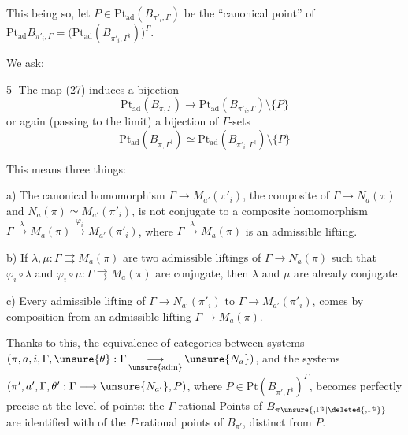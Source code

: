 This being so, let $P\in\mathrm{Pt}_{\mathrm{ad}}(B_{\pi'_i,\Gamma})$
be the ``canonical point'' of
$\mathrm{Pt}_{\mathrm{ad}}B_{\pi'_i,\Gamma}
=\bigl(\mathrm{Pt}_{\mathrm{ad}}(B_{\pi'_i,\Gamma^{\natural}})\bigr)^\Gamma$.


We ask:

\textcircled{5} The map (27) induces a \uline{bijection}
\[
\mathrm{Pt}_{\mathrm{ad}}(B_{\pi,\Gamma})
\longrightarrow
\mathrm{Pt}_{\mathrm{ad}}(B_{\pi'_i,\Gamma})\setminus\{P\}
\]
or again (passing to the limit) a bijection of $\Gamma$-sets
\[
\mathrm{Pt}_{\mathrm{ad}}(B_{\pi,\Gamma^{\natural}})
\simeq
\mathrm{Pt}_{\mathrm{ad}}(B_{\pi'_i,\Gamma^{\natural}})\setminus\{P\}
\]

This means three things:

a) The canonical homomorphism $\Gamma\longrightarrow M_{a'}(\pi'_i)$,
the composite of $\Gamma\longrightarrow N_a(\pi)$ and
$N_a(\pi)\simeq M_{a'}(\pi'_i)$,
is not conjugate to a composite homomorphism
$\Gamma\xrightarrow{\lambda}M_a(\pi)
\xrightarrow{\varphi_i}M_{a'}(\pi'_i)$,
where $\Gamma\xrightarrow{\lambda}M_a(\pi)$ is an admissible lifting.

b) If $\lambda,\mu:\Gamma\rightrightarrows M_a(\pi)$ are two
admissible liftings of $\Gamma\longrightarrow N_a(\pi)$
 such that
$\varphi_i\circ\lambda$ and $\varphi_i\circ\mu:
\Gamma\rightrightarrows M_a(\pi)$ are
conjugate, then $\lambda$ and $\mu$ are already
\inserted{$\pi$-}conjugate.

c) Every admissible lifting of
$\Gamma\longrightarrow N_{a'}(\pi'_i)$ to
$\Gamma\longrightarrow M_{a'}(\pi'_i)$,
comes by composition from an admissible lifting
$\Gamma\longrightarrow M_a(\pi)$.


Thanks to this, the equivalence of categories between systems
$(\pi,a,i,\Gamma,\unsure{\theta}:\Gamma\mathop{\longrightarrow}\limits_{\unsure{\mathrm{adm}}}\unsure{N_a})$,
and the systems $(\pi',a',\Gamma,\theta':\Gamma\longrightarrow\unsure{N_{a'}},P)$,
where $P\in\mathrm{Pt}(B_{\pi',\Gamma^{\natural}})^\Gamma$,
becomes perfectly precise at the level of points: the
$\Gamma$-rational Points of $B_{\pi\unsure{,\Gamma^{\natural}|\deleted{,\Gamma^{\natural}}}}$
are identified with 
 of the $\Gamma$-rational points
of $B_{\pi'}$, distinct from $P$.

